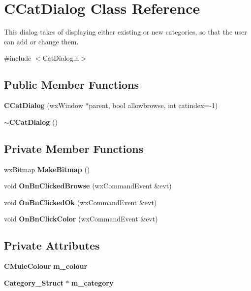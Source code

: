 \section{CCatDialog Class Reference}
\label{classCCatDialog}


This dialog takes of displaying either existing or new categories, so that the user can add or change them.  


{\ttfamily \#include $<$CatDialog.h$>$}\subsection*{Public Member Functions}
\begin{DoxyCompactItemize}
\item 
{\bf CCatDialog} (wxWindow $\ast$parent, bool allowbrowse, int catindex=-\/1)
\item 
{\bf $\sim$CCatDialog} ()\label{classCCatDialog_ac208ab0193c03fec35e4497c00e42a53}

\end{DoxyCompactItemize}
\subsection*{Private Member Functions}
\begin{DoxyCompactItemize}
\item 
wxBitmap {\bf MakeBitmap} ()
\item 
void {\bf OnBnClickedBrowse} (wxCommandEvent \&evt)\label{classCCatDialog_a9fdf5aa9cadb5c527065d33fe5673111}

\item 
void {\bf OnBnClickedOk} (wxCommandEvent \&evt)\label{classCCatDialog_a57fd45a5932f4ee21c25187a76a89d34}

\item 
void {\bf OnBnClickColor} (wxCommandEvent \&evt)\label{classCCatDialog_a38a2fdc70e4814e40acf7376be60aa56}

\end{DoxyCompactItemize}
\subsection*{Private Attributes}
\begin{DoxyCompactItemize}
\item 
{\bf CMuleColour} {\bf m\_\-colour}\label{classCCatDialog_a982e7ca4543db7a3c75d4ba895069e05}

\item 
{\bf Category\_\-Struct} $\ast$ {\bf m\_\-category}\label{classCCatDialog_a5494db895cdb27762751119e0f4d4bf6}

\end{DoxyCompactItemize}


